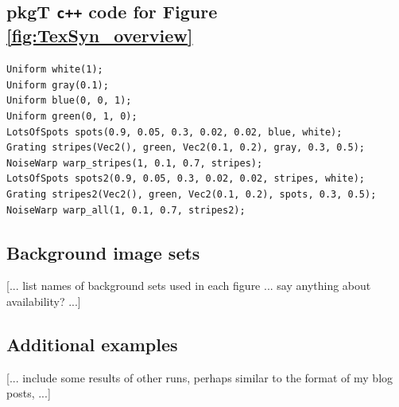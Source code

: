 \documentclass[acmtog]{acmart}
\newcommand{\texsyn}[0]{pkgT}
\begin{document}
\subsection{\texsyn{} \texttt{c++} code for Figure \ref{fig:TexSyn_overview}}
\begin{small}
\begin{verbatim}
Uniform white(1);
Uniform gray(0.1);
Uniform blue(0, 0, 1);
Uniform green(0, 1, 0);
LotsOfSpots spots(0.9, 0.05, 0.3, 0.02, 0.02, blue, white);
Grating stripes(Vec2(), green, Vec2(0.1, 0.2), gray, 0.3, 0.5);
NoiseWarp warp_stripes(1, 0.1, 0.7, stripes);
LotsOfSpots spots2(0.9, 0.05, 0.3, 0.02, 0.02, stripes, white);
Grating stripes2(Vec2(), green, Vec2(0.1, 0.2), spots, 0.3, 0.5);
NoiseWarp warp_all(1, 0.1, 0.7, stripes2);
\end{verbatim}
\end{small}


\subsection{Background image sets}
[... list names of background sets used in each figure ... say anything about availability? ...]

\subsection{Additional examples}
[... include some results of other runs, perhaps similar to the format of my blog posts,  ...]
\end{document}
